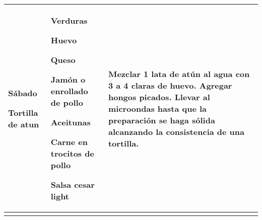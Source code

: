 \documentclass[menu.tex]{subfiles}
\begin{document}
\begin{tabular} {p{3cm} p{4.5cm} p{9cm}}
\pbox{20cm}
{
    \rule{0pt}{3ex}\begin{large}\textbf{Sábado}\end{large}\\
    \rule{0pt}{2ex}Tortilla de atun
}& 
\vspace{-0.3cm}
\begin{compactitem} 
    \begin{footnotesize}
        \item Verduras
        \item Huevo
        \item Queso
        \item Jamón o enrollado de pollo
        \item Aceitunas
        \item Carne en trocitos de pollo
        \item Salsa cesar light
    \end{footnotesize}
\end{compactitem}&
\vspace{-0.3cm}
Mezclar 1 lata de atún al agua con 3 a 4 claras de huevo. Agregar hongos picados. Llevar al microondas hasta que la preparación se haga sólida alcanzando la consistencia de una tortilla.\\ \hline
\newpage
\end{tabular}
\end{document}
